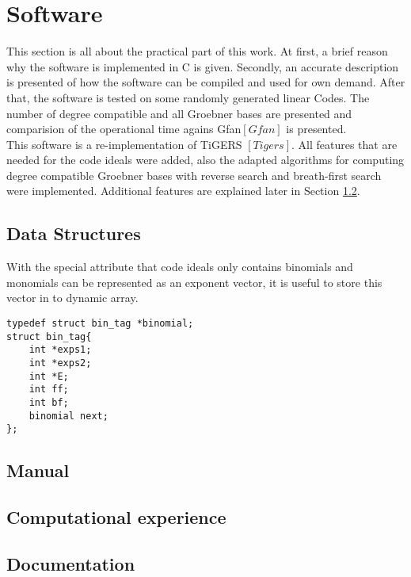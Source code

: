 \section{Software}
\label{sec:software}
This section is all about the practical part of this work. At first, a brief reason why the software is implemented in C is given. Secondly, an accurate description is presented of how the software can be compiled and used for own demand.
After that, the software is tested on some randomly generated linear Codes. The number of degree compatible and all Groebner bases are presented and comparision of the operational time agains Gfan$[Gfan]$ is presented.  \\ \newline
This software is a re-implementation of TiGERS $[Tigers]$. All features that are needed for the code ideals were added, also the adapted algorithms for computing degree compatible Groebner bases with reverse search and breath-first search were implemented.   
Additional features are explained later in Section \ref{subsec:manual}.







\subsection{Data Structures}
\label{subsec:datastructure}
With the special attribute that code ideals only contains binomials and monomials can be represented as an exponent vector, it is useful to store this vector in to dynamic array.

\begin{lstlisting} 
typedef struct bin_tag *binomial;
struct bin_tag{
    int *exps1;
    int *exps2;
    int *E;
    int ff;
    int bf;
    binomial next;
};

\end{lstlisting}


\subsection{Manual}
\label{subsec:manual}



\subsection{Computational experience}


\subsection{Documentation}

